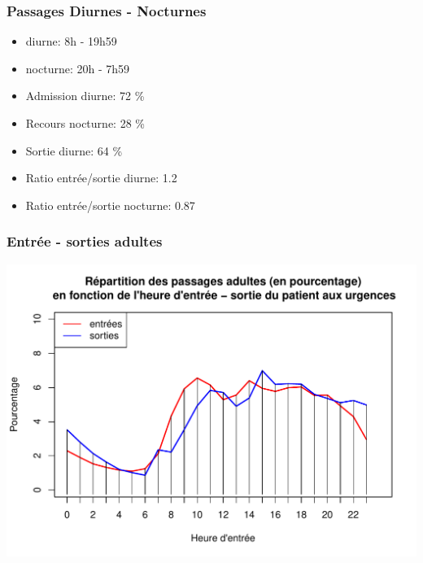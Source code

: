 \documentclass[12pt,english,french,twoside]{book}\usepackage[]{graphicx}\usepackage[]{color}
\makeatletter
\def\maxwidth{ %
  \ifdim\Gin@nat@width>\linewidth
    \linewidth
  \else
    \Gin@nat@width
  \fi
}
\newenvironment{knitrout}{}{} %
\makeatother
\begin{document}
 
\subsubsection*{Passages Diurnes - Nocturnes}

\begin{itemize}
  \item diurne: 8h - 19h59   
  
  \item nocturne: 20h - 7h59
\end{itemize}




\begin{boxedminipage}{10cm}
\begin{itemize}
  \item Admission diurne: 72 \%
  \item Recours nocturne: 28 \%
  \item Sortie diurne:    64 \%
  \item Ratio entrée/sortie diurne: 1.2
  \item Ratio entrée/sortie nocturne: 0.87
\end{itemize}
\end{boxedminipage}

\subsubsection*{Entrée - sorties adultes}

\begin{center}
\begin{knitrout}
\color{fgcolor}
\includegraphics[width=\maxwidth]{figure/es_adultes-1} 

\end{knitrout}
\label{fig:es_adultes}
\end{center}
\end{document}
